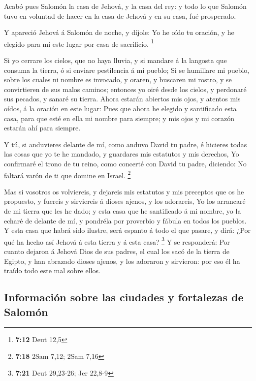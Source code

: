  Acabó pues Salomón la casa de Jehová, y la casa del rey:
y todo lo que Salomón tuvo en voluntad de hacer en la casa de Jehová y
en su casa, fué prosperado.

 Y apareció Jehová á Salomón de noche, y díjole: Yo he
oído tu oración, y he elegido para mí este lugar por casa de sacrificio.
\footnote{\textbf{7:12} Deut 12,5}

 Si yo cerrare los cielos, que no haya lluvia, y si
mandare á la langosta que consuma la tierra, ó si enviare pestilencia á
mi pueblo;  Si se humillare mi pueblo, sobre los cuales
ni nombre es invocado, y oraren, y buscaren mi rostro, y se convirtieren
de sus malos caminos; entonces yo oiré desde los cielos, y perdonaré sus
pecados, y sanaré su tierra.  Ahora estarán abiertos mis
ojos, y atentos mis oídos, á la oración en este lugar: 
Pues que ahora he elegido y santificado esta casa, para que esté en ella
mi nombre para siempre; y mis ojos y mi corazón estarán ahí para
siempre.

 Y tú, si anduvieres delante de mí, como anduvo David tu
padre, é hicieres todas las cosas que yo te he mandado, y guardares mis
estatutos y mis derechos,  Yo confirmaré el trono de tu
reino, como concerté con David tu padre, diciendo: No faltará varón de
ti que domine en Israel. \footnote{\textbf{7:18} 2Sam 7,12; 2Sam 7,16}

 Mas si vosotros os volviereis, y dejareis mis estatutos
y mis preceptos que os he propuesto, y fuereis y sirviereis á dioses
ajenos, y los adorareis,  Yo los arrancaré de mi tierra
que les he dado; y esta casa que he santificado á mi nombre, yo la
echaré de delante de mí, y pondréla por proverbio y fábula en todos los
pueblos.  Y esta casa que habrá sido ilustre, será
espanto á todo el que pasare, y dirá: ¿Por qué ha hecho así Jehová á
esta tierra y á esta casa? \footnote{\textbf{7:21} Deut 29,23-26; Jer
  22,8-9}  Y se responderá: Por cuanto dejaron á Jehová
Dios de sus padres, el cual los sacó de la tierra de Egipto, y han
abrazado dioses ajenos, y los adoraron y sirvieron: por eso él ha traído
todo este mal sobre ellos.

\hypertarget{informaciuxf3n-sobre-las-ciudades-y-fortalezas-de-salomuxf3n}{%
\subsection{Información sobre las ciudades y fortalezas de
Salomón}\label{informaciuxf3n-sobre-las-ciudades-y-fortalezas-de-salomuxf3n}}

